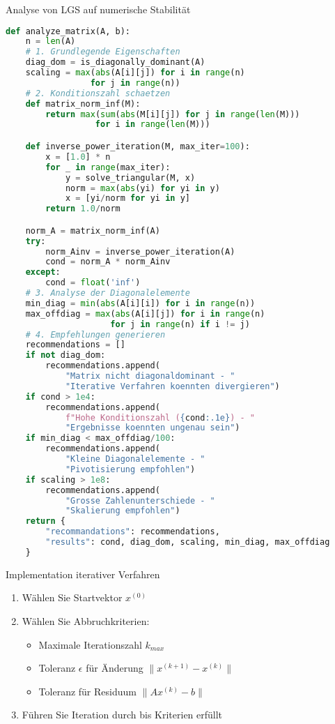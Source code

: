 \begin{examplecode}{Analyse von LGS auf numerische Stabilität}
\begin{lstlisting}[language=Python, style=basesmol]
def analyze_matrix(A, b):
    n = len(A)
    # 1. Grundlegende Eigenschaften
    diag_dom = is_diagonally_dominant(A)
    scaling = max(abs(A[i][j]) for i in range(n) 
                 for j in range(n))
    # 2. Konditionszahl schaetzen 
    def matrix_norm_inf(M):
        return max(sum(abs(M[i][j]) for j in range(len(M))) 
                  for i in range(len(M)))

    def inverse_power_iteration(M, max_iter=100):
        x = [1.0] * n
        for _ in range(max_iter):
            y = solve_triangular(M, x)
            norm = max(abs(yi) for yi in y)
            x = [yi/norm for yi in y]
        return 1.0/norm

    norm_A = matrix_norm_inf(A)
    try:
        norm_Ainv = inverse_power_iteration(A)
        cond = norm_A * norm_Ainv
    except:
        cond = float('inf')
    # 3. Analyse der Diagonalelemente
    min_diag = min(abs(A[i][i]) for i in range(n))
    max_offdiag = max(abs(A[i][j]) for i in range(n) 
                     for j in range(n) if i != j)
    # 4. Empfehlungen generieren
    recommendations = []
    if not diag_dom:
        recommendations.append(
            "Matrix nicht diagonaldominant - "
            "Iterative Verfahren koennten divergieren")
    if cond > 1e4:
        recommendations.append(
            f"Hohe Konditionszahl ({cond:.1e}) - "
            "Ergebnisse koennten ungenau sein")
    if min_diag < max_offdiag/100:
        recommendations.append(
            "Kleine Diagonalelemente - "
            "Pivotisierung empfohlen")
    if scaling > 1e8:
        recommendations.append(
            "Grosse Zahlenunterschiede - "
            "Skalierung empfohlen")
    return {
        "recommandations": recommendations, 
        "results": cond, diag_dom, scaling, min_diag, max_offdiag
    }
\end{lstlisting}
\end{examplecode}

\begin{KR}{Implementation iterativer Verfahren}
\begin{enumerate}
    \item Wählen Sie Startvektor $x^{(0)}$
    \item Wählen Sie Abbruchkriterien:
        \begin{itemize}
            \item Maximale Iterationszahl $k_{max}$
            \item Toleranz $\epsilon$ für Änderung $\|x^{(k+1)} - x^{(k)}\|$
            \item Toleranz für Residuum $\|Ax^{(k)} - b\|$
        \end{itemize}
    \item Führen Sie Iteration durch bis Kriterien erfüllt
\end{enumerate}
\end{KR}

